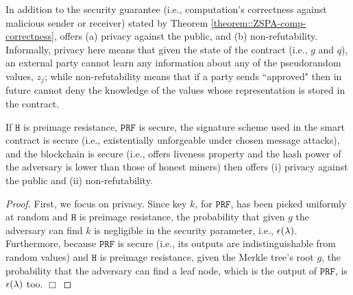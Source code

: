 In addition to the security guarantee (i.e., computation's correctness against malicious sender or receiver) stated by Theorem \ref{theorem::ZSPA-comp-correctness}, \zspa offers  (a) privacy against the public, and (b)  non-refutability. Informally, privacy here means that given the state of the contract (i.e., $g$ and  $q$), an external party cannot learn any information about any of the pseudorandom values,  $z_{\scriptscriptstyle j}$; while non-refutability means that if a party sends ``approved" then in future cannot deny the knowledge of the values whose representation is stored in the contract. %



\begin{theorem}
If  $\mathtt{H}$ is preimage resistance, $\mathtt{PRF}$ is secure, the signature scheme used in the smart contract is secure (i.e., existentially unforgeable under chosen message attacks), and the blockchain is secure (i.e., offers liveness property and the hash power of the adversary is lower than those of honest miners) then \zspa offers (i) privacy against the public and (ii) non-refutability. 
\end{theorem}
 
 

\begin{proof}
First, we focus on privacy. Since key $k$, for $\mathtt{PRF}$, has been picked uniformly at random and $\mathtt{H}$ is preimage resistance, the probability that given $g$ the adversary can find $k$ is negligible in the security parameter, i.e., $\epsilon(\lambda)$. Furthermore, because $\mathtt{PRF}$ is secure (i.e., its outputs are indistinguishable from random values) and  $\mathtt{H}$ is preimage resistance, given the Merkle tree's root $g$, the probability that the adversary can find a leaf node, which is the output of $\mathtt{PRF}$, is $\epsilon(\lambda)$ too. 
  \hfill\(\Box\)\end{proof}